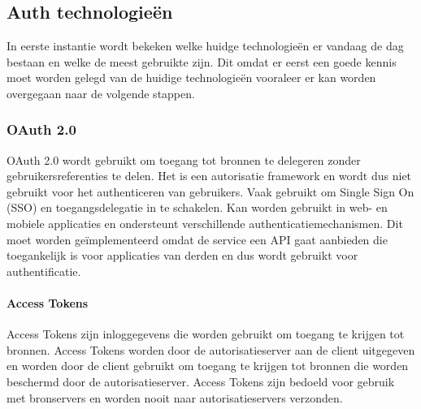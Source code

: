 \chapter{}%
\label{ch:stand-van-zaken}



\section{Auth technologieën}%
\label{sec:auth-technologieën}
In eerste instantie wordt bekeken welke huidge technologieën er vandaag de dag bestaan en welke de meest gebruikte zijn. Dit omdat er eerst een goede kennis
moet worden gelegd van de huidige technologieën vooraleer er kan worden overgegaan naar de volgende stappen.


\subsection{OAuth 2.0}%
\label{subsec:oauth-2.0}
\autocite{Hardt2012}
OAuth 2.0 wordt gebruikt om toegang tot bronnen te delegeren zonder gebruikersreferenties te delen. Het is een autorisatie framework en wordt dus niet gebruikt voor het authenticeren van gebruikers. Vaak gebruikt om Single Sign On (SSO) en toegangsdelegatie in te schakelen. Kan worden gebruikt in web- en mobiele applicaties en ondersteunt verschillende authenticatiemechanismen.
Dit moet worden geïmplementeerd omdat de service een API gaat aanbieden die toegankelijk is voor applicaties van derden en dus wordt gebruikt voor authentificatie.

\subsubsection{Access Tokens}%
\label{subsubsec:access-tokens}
Access Tokens zijn inloggegevens die worden gebruikt om toegang te krijgen tot bronnen. Access Tokens worden door de autorisatieserver aan de client uitgegeven en worden door de client gebruikt om toegang te krijgen tot bronnen die worden beschermd door de autorisatieserver. Access Tokens zijn bedoeld voor gebruik met bronservers en worden nooit naar autorisatieservers verzonden.

